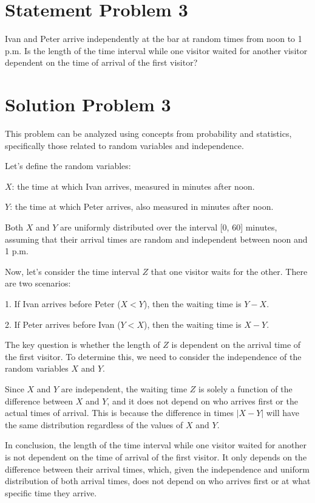 \section*{Statement Problem 3}

Ivan and Peter arrive independently at the bar at random times from noon to 1 p.m. Is the length of the time interval while one visitor waited for another visitor dependent on the time of arrival of the first visitor?

\section*{Solution Problem 3}

This problem can be analyzed using concepts from probability and statistics, specifically those related to random variables and independence.

Let's define the random variables:

\( X \): the time at which Ivan arrives, measured in minutes after noon.

\( Y \): the time at which Peter arrives, also measured in minutes after noon.

Both \( X \) and \( Y \) are uniformly distributed over the interval [0, 60] minutes, assuming that their arrival times are random and independent between noon and 1 p.m.

Now, let's consider the time interval \( Z \) that one visitor waits for the other. There are two scenarios:

1. If Ivan arrives before Peter (\( X < Y \)), then the waiting time is \( Y - X \).

2. If Peter arrives before Ivan (\( Y < X \)), then the waiting time is \( X - Y \).

The key question is whether the length of \( Z \) is dependent on the arrival time of the first visitor. To determine this, we need to consider the independence of the random variables \( X \) and \( Y \).

Since \( X \) and \( Y \) are independent, the waiting time \( Z \) is solely a function of the difference between \( X \) and \( Y \), and it does not depend on who arrives first or the actual times of arrival. This is because the difference in times \( |X - Y| \) will have the same distribution regardless of the values of \( X \) and \( Y \).

In conclusion, the length of the time interval while one visitor waited for another is not dependent on the time of arrival of the first visitor. It only depends on the difference between their arrival times, which, given the independence and uniform distribution of both arrival times, does not depend on who arrives first or at what specific time they arrive.